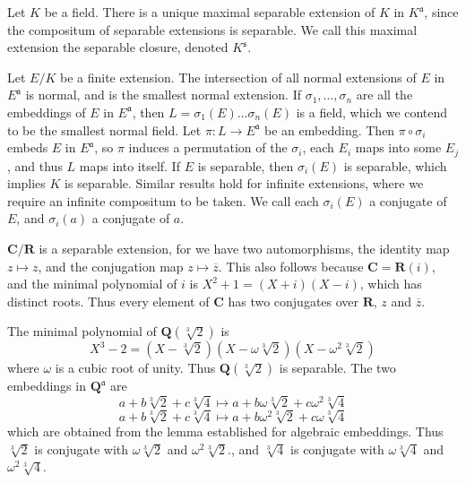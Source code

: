 \begin{example}
    Let $K$ be a field. There is a unique maximal separable extension of $K$ in $K^{\mathfrak{a}}$, since the compositum of separable extensions is separable. We call this maximal extension the separable closure, denoted $K^{\mathfrak{s}}$.
\end{example}

Let $E/K$ be a finite extension. The intersection of all normal extensions of $E$ in $E^{\mathfrak{a}}$ is normal, and is the smallest normal extension. If $\sigma_1, \dots, \sigma_n$ are all the embeddings of $E$ in $E^{\mathfrak{a}}$, then $L = \sigma_1(E) \dots \sigma_n(E)$ is a field, which we contend to be the smallest normal field. Let $\pi: L \to E^{\mathfrak{a}}$ be an embedding. Then $\pi \circ \sigma_i$ embeds $E$ in $E^{\mathfrak{a}}$, so $\pi$ induces a permutation of the $\sigma_i$, each $E_i$ maps into some $E_j$, and thus $L$ maps into itself. If $E$ is separable, then $\sigma_i(E)$ is separable, which implies $K$ is separable. Similar results hold for infinite extensions, where we require an infinite compositum to be taken. We call each $\sigma_i(E)$ a conjugate of $E$, and $\sigma_i(a)$ a conjugate of $a$.

\begin{example}
    $\mathbf{C}/\mathbf{R}$ is a separable extension, for we have two automorphisms, the identity map $z \mapsto z$, and the conjugation map $z \mapsto \overline{z}$. This also follows because $\mathbf{C} = \mathbf{R}(i)$, and the minimal polynomial of $i$ is $X^2 + 1 = (X + i)(X - i)$, which has distinct roots. Thus every element of $\mathbf{C}$ has two conjugates over $\mathbf{R}$, $z$ and $\overline{z}$.
\end{example}

\begin{example}
    The minimal polynomial of $\mathbf{Q}(\sqrt[3]{2})$ is
    \[ X^3 - 2 = (X - \sqrt[3]{2})(X - \omega \sqrt[3]{2})(X - \omega^2 \sqrt[3]{2}) \]
    where $\omega$ is a cubic root of unity. Thus $\mathbf{Q}(\sqrt[3]{2})$ is separable. The two embeddings in $\mathbf{Q}^{\mathfrak{a}}$ are
    \[ a + b \sqrt[3]{2} + c \sqrt[3]{4} \mapsto a + b \omega \sqrt[3]{2} + c \omega^2 \sqrt[3]{4} \]
    \[ a + b \sqrt[3]{2} + c \sqrt[3]{4} \mapsto a + b \omega^2 \sqrt[3]{2} + c \omega \sqrt[3]{4} \]
    which are obtained from the lemma established for algebraic embeddings. Thus $\sqrt[3]{2}$ is conjugate with $\omega \sqrt[3]{2}$ and $\omega^2 \sqrt[3]{2}$., and $\sqrt[3]{4}$ is conjugate with $\omega \sqrt[3]{4}$ and $\omega^2 \sqrt[3]{4}$.
\end{example}

